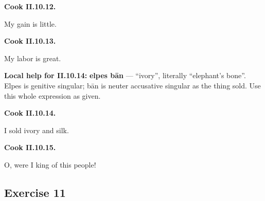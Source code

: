 \par\begin{minipage}{\linewidth}\raggedright
\textbf{Cook II.10.12.}

My gain is little.

\end{minipage}\par\addvspace{4pt}

\par\begin{minipage}{\linewidth}\raggedright
\textbf{Cook II.10.13.}

My labor is great.

\end{minipage}\par\addvspace{4pt}

\textbf{Local help for II.10.14:} \textbf{elpes bān} — “ivory”, literally “elephant’s bone”. Elpes is genitive singular; bān is neuter accusative singular as the thing sold. Use this whole expression as given.

\par\begin{minipage}{\linewidth}\raggedright
\textbf{Cook II.10.14.}

I sold ivory and silk.

\end{minipage}\par\addvspace{4pt}

\par\begin{minipage}{\linewidth}\raggedright
\textbf{Cook II.10.15.}

O, were I king of this people!

\end{minipage}\par\addvspace{4pt}

\subsection*{Exercise 11}

